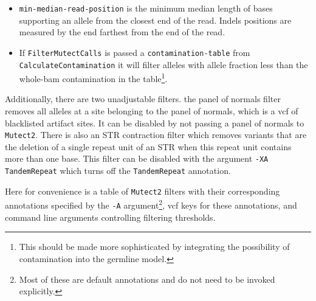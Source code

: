 \documentclass[nofootinbib,amssymb,amsmath]{revtex4}
\newcommand{\code}[1]{\texttt{#1}}
\begin{document}
\begin{itemize}
\item \code{min-median-read-position} is the minimum median length of bases supporting an allele from the closest end of the read.  Indels positions are measured by the end farthest from the end of the read.
\item If \code{FilterMutectCalls} is passed a \code{contamination-table} from \code{CalculateContamination} it will filter alleles with allele fraction less than the whole-bam contamination in the table\footnote{This should be made more sophisticated by integrating the possibility of contamination into the germline model.}.
\end{itemize}

Additionally, there are two unadjustable filters. the panel of normals filter removes all alleles at a site belonging to the panel of normals, which is a vcf of blacklisted artifact sites.  It can be disabled by not passing a panel of normals to \code{Mutect2}.  There is also an STR contraction filter which removes variants that are the deletion of a single repeat unit of an STR when this repeat unit contains more than one base.  This filter can be disabled with the argument \code{-XA TandemRepeat} which turns off the \code{TandemRepeat} annotation.

Here for convenience is a table of \code{Mutect2} filters with their corresponding annotations specified by the \code{-A} argument\footnote{Most of these are default annotations and do not need to be invoked explicitly.}, vcf keys for these annotations, and command line arguments controlling filtering thresholds.
\end{document}
